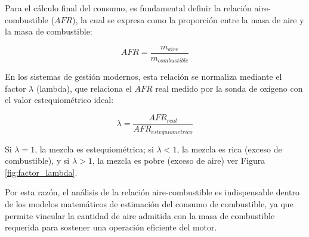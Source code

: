 Para el cálculo final del consumo, es fundamental definir la relación aire-combustible ($AFR$), la cual se expresa como la proporción entre la masa de aire y la masa de combustible:

\begin{equation}
	AFR = \frac{m_{aire}}{m_{combustible}}
\end{equation}

En los sistemas de gestión modernos, esta relación se normaliza mediante el factor $\lambda$ (lambda), que relaciona el $AFR$ real medido por la sonda de oxígeno con el valor estequiométrico ideal:

\begin{equation}
	\lambda = \frac{AFR_{real}}{AFR_{estequiometrico}}
\end{equation}

Si $\lambda = 1$, la mezcla es estequiométrica; si $\lambda < 1$, la mezcla es rica (exceso de combustible), y si $\lambda > 1$, la mezcla es pobre (exceso de aire) ver Figura \ref{fig:factor_lambda}.

Por esta razón, el análisis de la relación aire-combustible es indispensable dentro de los modelos matemáticos de estimación del consumo de combustible, ya que permite vincular la cantidad de aire admitida con la masa de combustible requerida para sostener una operación eficiente del motor.

